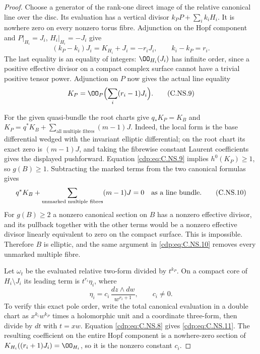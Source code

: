 \begin{proof}
Choose a generator of the rank-one direct image of
the relative canonical line over the disc. Its
evaluation has a vertical divisor
$k_PP+\sum_i k_iH_i$. It is nowhere zero on every
nonzero torus fibre. Adjunction on the Hopf component
and $P|_{H_i}=J_i$, $H_i|_{H_i}=-J_i$ give
\[
 (k_P-k_i)J_i=K_{H_i}+J_i=-r_iJ_i,
       \qquad k_i-k_P=r_i.
                                                        \tag{C.NS.8}\label{cdp:eq:C.NS.8}
\]
The last equality is an equality of integers:
$\OO_{H_i}(J_i)$ has infinite order, since a
positive effective divisor on a compact complex
surface cannot have a trivial positive tensor power.
Adjunction on $P$ now gives the actual line equality
\[
                         K_P=\OO_P\Bigl(\sum_i(r_i-1)J_i\Bigr).
                                                        \tag{C.NS.9}\label{cdp:eq:C.NS.9}
\]

For the given quasi-bundle the root charts give
$q_*K_P=K_B$ and
$K_P=q^*K_B+\sum_{\text{all multiple fibres}}(m-1)J$.
Indeed, the local form is the base differential
wedged with the invariant elliptic differential;
on the root chart its exact zero is $(m-1)J$,
and taking the fibrewise constant Laurent
coefficients gives the displayed pushforward.
Equation \eqref{cdp:eq:C.NS.9} implies $h^0(K_P)\ge1$, so
$g(B)\ge1$. Subtracting the marked terms from
the two canonical formulas gives
\[
 q^*K_B+\sum_{\text{unmarked multiple fibres}}(m-1)J=0
                    \quad\hbox{as a line bundle}.       \tag{C.NS.10}\label{cdp:eq:C.NS.10}
\]
For $g(B)\ge2$ a nonzero canonical section on $B$
has a nonzero effective divisor, and its pullback
together with the other terms would be a nonzero
effective divisor linearly equivalent to zero on
the compact surface. This is impossible. Therefore
$B$ is elliptic, and the same argument in \eqref{cdp:eq:C.NS.10}
removes every unmarked multiple fibre.

Let $\omega_t$ be the evaluated relative two-form
divided by $t^{k_P}$. On a compact core of $H_i\setminus J_i$
its leading term is $t^{r_i}\eta_i$, where
\[
 \eta_i=c_i\,\frac{dz\wedge dw}{w^{r_i+1}},
                         \qquad c_i\ne0.                \tag{C.NS.11}\label{cdp:eq:C.NS.11}
\]
To verify this exact pole order, write the total
canonical evaluation in a double chart as
$x^{k_i}w^{k_P}$ times a holomorphic unit and a
coordinate three-form, then divide by $dt$ with
$t=xw$. Equation \eqref{cdp:eq:C.NS.8} gives \eqref{cdp:eq:C.NS.11}.
The resulting coefficient on the entire Hopf
component is a nowhere-zero section of
$K_{H_i}((r_i+1)J_i)=\OO_{H_i}$, so it is the
nonzero constant $c_i$.


\end{proof}
